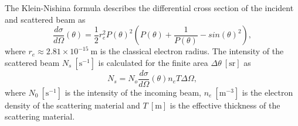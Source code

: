 \documentclass[a4paper,12pt,titlepage, twoside]{article}
\newcommand{\unit}[2]{$#1~\ensuremath{\mathrm{#2}}$}
\begin{document}
The Klein-Nishina formula \cite{leo2012techniques} describes the differential cross section of the incident and scattered beam as
\begin{equation}
  \frac{d\sigma}{d\Omega}\left(\theta\right) = \frac{1}{2}r_{e}^2P\left(\theta\right)^2\left(P\left(\theta\right) + \frac{1}{P\left(\theta\right)} - sin\left(\theta\right)^2\right),
\end{equation}
where \unit{r_e \approx 2.81 \times 10^{-15}}{m} is the classical electron radius.
The intensity of the scattered beam \unit{N_s}{\left[s^{-1}\right]} is calculated for the finite area \unit{\Delta \theta}{\left[sr\right]} as
\begin{equation}
  N_s = N_o \frac{d\sigma}{d\Omega}\left(\theta\right) n_e T \Delta\Omega,
\end{equation}
where \unit{N_0}{\left[s^{-1}\right]} is the intensity of the incoming beam, \unit{n_e}{\left[m^{-3}\right]} is the electron density of the scattering material and \unit{T}{\left[m\right]} is the effective thickness of the scattering material.
\end{document}
